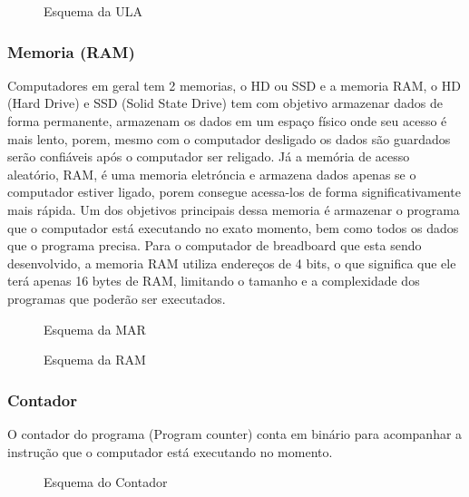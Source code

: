 \vspace{1cm}
\begin{figure}[H] \centering 
  \caption{\label{schematics_alu} Esquema da ULA} 
\end{figure}

\subsubsection{Memoria (RAM)}
Computadores em geral tem 2 memorias, o HD ou SSD e a memoria RAM, o HD (Hard Drive) e SSD (Solid State Drive) tem com objetivo armazenar dados de forma permanente, armazenam os dados em um espaço físico onde seu acesso é mais lento, porem, mesmo com o computador desligado os dados são guardados serão confiáveis após o computador ser religado. Já a memória de acesso aleatório, RAM, é uma memoria eletróncia e armazena dados apenas se o computador estiver ligado, porem consegue acessa-los de forma significativamente mais rápida. Um dos objetivos principais dessa memoria é armazenar o programa que o computador está executando no exato momento, bem como todos os dados que o programa precisa. Para o computador de breadboard que esta sendo desenvolvido, a memoria RAM utiliza endereços de 4 bits, o que significa que ele terá apenas 16 bytes de RAM, limitando o tamanho e a complexidade dos programas que poderão ser executados.

\vspace{1cm}
\begin{figure}[H] \centering 
  \caption{\label{schematics_mar} Esquema da MAR} 
\end{figure}

\vspace{1cm}
\begin{figure}[H] \centering 
  \caption{\label{schematics_ram} Esquema da RAM} 
\end{figure}

\subsubsection{Contador}
O contador do programa (Program counter) conta em binário para acompanhar a instrução que o computador está executando no momento.

\vspace{1cm}
\begin{figure}[H] \centering 
  \caption{\label{schematics_pc} Esquema do Contador} 
\end{figure}

